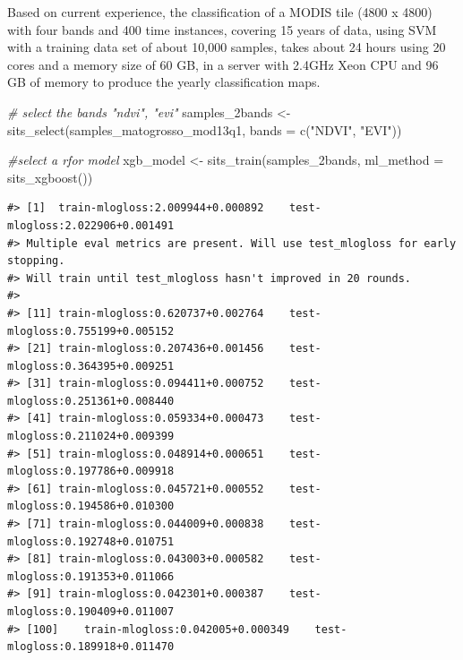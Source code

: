 \documentclass[a4paper,]{tufte-book}
\newenvironment{Shaded}{}{}
\newcommand{\AttributeTok}[1]{\textcolor[rgb]{0.49,0.56,0.16}{#1}}
\newcommand{\CommentTok}[1]{\textcolor[rgb]{0.38,0.63,0.69}{\textit{#1}}}
\newcommand{\FunctionTok}[1]{\textcolor[rgb]{0.02,0.16,0.49}{#1}}
\newcommand{\NormalTok}[1]{#1}
\newcommand{\OtherTok}[1]{\textcolor[rgb]{0.00,0.44,0.13}{#1}}
\newcommand{\StringTok}[1]{\textcolor[rgb]{0.25,0.44,0.63}{#1}}
\begin{document}
Based on current experience, the classification of a MODIS tile (4800 x 4800) with four bands and 400 time instances, covering 15 years of data, using SVM with a training data set of about 10,000 samples, takes about 24 hours using 20 cores and a memory size of 60 GB, in a server with 2.4GHz Xeon CPU and 96 GB of memory to produce the yearly classification maps.

\begin{Shaded}
\begin{Highlighting}[]
\CommentTok{\# select the bands "ndvi", "evi"}
\NormalTok{samples\_2bands }\OtherTok{\textless{}{-}} \FunctionTok{sits\_select}\NormalTok{(samples\_matogrosso\_mod13q1, }\AttributeTok{bands =} \FunctionTok{c}\NormalTok{(}\StringTok{"NDVI"}\NormalTok{, }\StringTok{"EVI"}\NormalTok{))}

\CommentTok{\#select a rfor model}
\NormalTok{xgb\_model }\OtherTok{\textless{}{-}} \FunctionTok{sits\_train}\NormalTok{(samples\_2bands, }\AttributeTok{ml\_method =} \FunctionTok{sits\_xgboost}\NormalTok{())}
\end{Highlighting}
\end{Shaded}

\begin{verbatim}
#> [1]  train-mlogloss:2.009944+0.000892    test-mlogloss:2.022906+0.001491 
#> Multiple eval metrics are present. Will use test_mlogloss for early stopping.
#> Will train until test_mlogloss hasn't improved in 20 rounds.
#> 
#> [11] train-mlogloss:0.620737+0.002764    test-mlogloss:0.755199+0.005152 
#> [21] train-mlogloss:0.207436+0.001456    test-mlogloss:0.364395+0.009251 
#> [31] train-mlogloss:0.094411+0.000752    test-mlogloss:0.251361+0.008440 
#> [41] train-mlogloss:0.059334+0.000473    test-mlogloss:0.211024+0.009399 
#> [51] train-mlogloss:0.048914+0.000651    test-mlogloss:0.197786+0.009918 
#> [61] train-mlogloss:0.045721+0.000552    test-mlogloss:0.194586+0.010300 
#> [71] train-mlogloss:0.044009+0.000838    test-mlogloss:0.192748+0.010751 
#> [81] train-mlogloss:0.043003+0.000582    test-mlogloss:0.191353+0.011066 
#> [91] train-mlogloss:0.042301+0.000387    test-mlogloss:0.190409+0.011007 
#> [100]    train-mlogloss:0.042005+0.000349    test-mlogloss:0.189918+0.011470
\end{verbatim}
\end{document}
